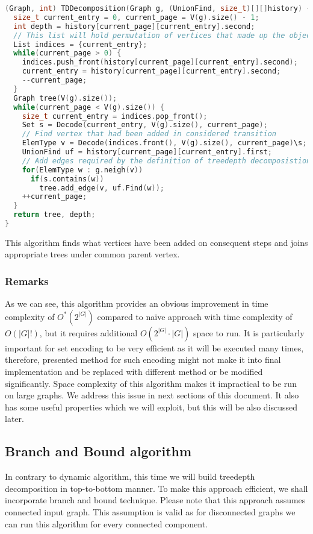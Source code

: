 \begin{lstlisting}[language=C++]
(Graph, int) TDDecomposition(Graph g, (UnionFind, size_t)[][]history) {
  size_t current_entry = 0, current_page = V(g).size() - 1;
  int depth = history[current_page][current_entry].second;
  // This list will hold permutation of vertices that made up the object in history[current_page][current_entry]
  List indices = {current_entry};
  while(current_page > 0) {
    indices.push_front(history[current_page][current_entry].second);
    current_entry = history[current_page][current_entry].second;
    --current_page;
  }
  Graph tree(V(g).size());
  while(current_page < V(g).size()) {
    size_t current_entry = indices.pop_front();
    Set s = Decode(current_entry, V(g).size(), current_page);
    // Find vertex that had been added in considered transition
    ElemType v = Decode(indices.front(), V(g).size(), current_page)\s;
    UnionFind uf = history[current_page][current_entry].first;
    // Add edges required by the definition of treedepth decomposistion
    for(ElemType w : g.neigh(v))
      if(s.contains(w))
        tree.add_edge(v, uf.Find(w));
    ++current_page;
  }
  return tree, depth;
}
\end{lstlisting}
This algorithm finds what vertices have been added on consequent steps and joins appropriate trees under common parent vertex.
\subsubsection{Remarks}
As we can see, this algorithm provides an obvious improvement in time complexity of $O^{*}\left(2^{\left|G\right|}\right)$ compared to na\"ive approach with time complexity of $O\left(\left|G\right|!\right)$, but it requires additional $O\left(2^{\left|G\right|}\cdot\left|G\right|\right)$ space to run. It is particularly important for set encoding to be very efficient as it will be executed many times, therefore, presented method for such encoding might not make it into final implementation and be replaced with different method or be modified significantly. Space complexity of this algorithm makes it impractical to be run on large graphs. We address this issue in next sections of this document. It also has some useful properties which we will exploit, but this will be also discussed later.
\subsection{Branch and Bound algorithm}
In contrary to dynamic algorithm, this time we will build treedepth decomposition in top-to-bottom manner. To make this approach efficient, we shall incorporate branch and bound technique. Please note that this approach assumes connected input graph. This assumption is valid as for disconnected graphs we can run this algorithm for every connected component.
